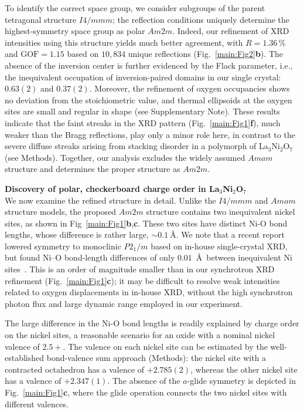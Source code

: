 \documentclass[aps,12pt,floatfix,longbibliography,a4paper]{revtex4-2}
\newcommand{\LNO}{La$_3$Ni$_2$O$_7$}
\begin{document}
To identify the correct space group, we consider subgroups of the parent tetragonal structure $I4/mmm$; the reflection conditions uniquely determine the highest-symmetry space group as polar $Am2m$. Indeed, our refinement of XRD intensities using this structure yields much better agreement, with $R=1.36\,\%$ and $\text{GOF}=1.15$ based on $10,834$ unique reflections (Fig.~\ref{main:Fig2}\textbf{b}). The absence of the inversion center is further evidenced by the Flack parameter, i.e., the inequivalent occupation of inversion-paired domains in our single crystal: $0.63(2)$ and $0.37(2)$. Moreover, the refinement of oxygen occupancies shows no deviation from the stoichiometric value, and thermal ellipsoids at the oxygen sites are small and regular in shape (see Supplementary Note). These results indicate that the faint streaks in the XRD pattern (Fig.~\ref{main:Fig1}\textbf{f}), much weaker than the Bragg reflections, play only a minor role here, in contrast to the severe diffuse streaks arising from stacking disorder in a polymorph of \LNO{} (see Methods). Together, our analysis excludes the widely assumed $Amam$ structure and determines the proper structure as $Am2m$.

\bigskip
\textbf{Discovery of polar, checkerboard charge order in \LNO{}}\\
We now examine the refined structure in detail. Unlike the $I4/mmm$ and $Amam$ structure models, the proposed $Am2m$ structure contains two inequivalent nickel sites, as shown in Fig~\ref{main:Fig1}\textbf{b},\textbf{c}. These two sites have distinct Ni-O bond lengths, whose difference is rather large, $\sim 0.1~\text{\AA}$. We note that a recent report lowered symmetry to monoclinic $P2_1/m$ based on in-house single-crystal XRD, but found Ni–O bond-length differences of only $0.01$~\AA\ between inequivalent Ni sites~\cite{Li2026-go}. This is an order of magnitude smaller than in our synchrotron XRD refinement (Fig.~\ref{main:Fig1}\textbf{c}); it may be difficult to resolve weak intensities related to oxygen displacements in in-house XRD, without the high synchrotron photon flux and large dynamic range employed in our experiment. 

The large difference in the Ni-O bond lengths is readily explained by charge order on the nickel sites, a reasonable scenario for an oxide with a nominal nickel valence of $2.5+$. The valence on each nickel site can be estimated by the well-established bond-valence sum approach (Methods): the nickel site with a contracted octahedron has a valence of $+2.785(2)$, whereas the other nickel site has a valence of $+2.347(1)$. The absence of the $a$-glide symmetry is depicted in Fig.~\ref{main:Fig1}\textbf{c}, where the glide operation connects the two nickel sites with different valences.
\end{document}
